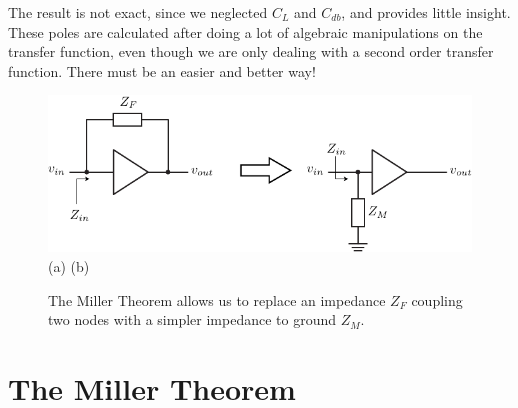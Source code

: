 The result is not exact, since we neglected $C_L$ and $C_{db}$, and provides little insight.  These poles are calculated after doing a lot of algebraic manipulations on the transfer function, even though we are only dealing with a second order transfer function. There must be an easier and better way!
\newpage
\begin{figure}[t]
\centering
\includegraphics[scale=1.05]{miller2}\\
(a) \qquad \qquad \qquad \qquad \qquad \qquad \qquad \qquad \qquad \qquad (b)
\caption{The Miller Theorem allows us to replace an impedance $Z_F$ coupling two nodes with a simpler impedance to ground $Z_M$.}
\label{fig:miller1}
\end{figure}
\section{The Miller Theorem}
